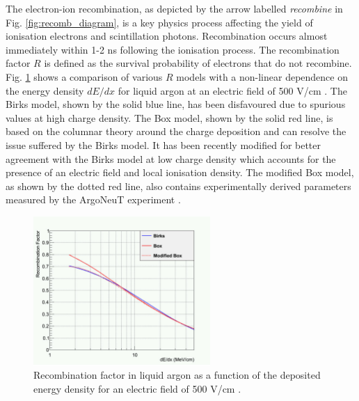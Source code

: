 The electron-ion recombination, as depicted by the arrow labelled \textit{recombine} in Fig. \ref{fig:recomb_diagram}, is a key physics process affecting the yield of ionisation electrons and scintillation photons.
Recombination occurs almost immediately within 1-2 ns following the ionisation process.                                                                                                                
The recombination factor $R$ is defined as the survival probability of electrons that do not recombine.
Fig. \ref{fig:recomb_graph} shows a comparison of various $R$ models with a non-linear dependence on the energy density $dE/dx$ for liquid argon at an electric field of 500 V/cm \cite{argoneut_recomb}.
The Birks model, shown by the solid blue line, has been disfavoured due to spurious values at high charge density.
The Box model, shown by the solid red line, is based on the columnar theory around the charge deposition and can resolve the issue suffered by the Birks model.
It has been recently modified for better agreement with the Birks model at low charge density which accounts for the presence of an electric field and local ionisation density.
The modified Box model, as shown by the dotted red line, also contains experimentally derived parameters measured by the ArgoNeuT experiment \cite{argoneut_recomb}.


\begin{figure}[ht!] 
\centering    
\includegraphics[width=0.6\textwidth]{recomb_graph}
\caption[Reombination Factor in Liquid Argon]{
Recombination factor in liquid argon as a function of the deposited energy density for an electric field of 500 V/cm \cite{argoneut_recomb}.
}
\label{fig:recomb_graph}
\end{figure}

